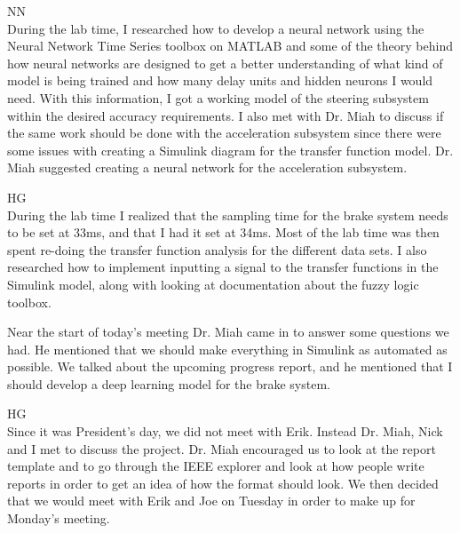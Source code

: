 \documentclass[fontsize=11pt, %
                             paper=letter, %
                             openany, %
                             captions=tableheading,
                             index=totoc,
                             hyperref]{labbook}
\def\currentYear{2021}
\begin{document}
\begin{addmargin}[0cm]{0cm}
\labday{Monday, February 21, \currentYear}
NN\\
During the lab time, I researched how to develop a neural network using the Neural Network Time Series toolbox on MATLAB and some of the theory behind how neural networks are designed to get a better understanding of what kind of model is being trained and how many delay units and hidden neurons I would need. With this information, I got a working model of the steering subsystem within the desired accuracy requirements. I also met with Dr. Miah to discuss if the same work should be done with the acceleration subsystem since there were some issues with creating a Simulink diagram for the transfer function model. Dr. Miah suggested creating a neural network for the acceleration subsystem.

HG\\
During the lab time I realized that the sampling time for the brake system needs to be set at 33ms, and that I had it set at 34ms. Most of the lab time was then spent re-doing the transfer function analysis for the different data sets. I also researched how to implement inputting a signal to the transfer functions in the Simulink model, along with looking at documentation about the fuzzy logic toolbox. 

Near the start of today's meeting Dr. Miah came in to answer some questions we had. He mentioned that we should make everything in Simulink as automated as possible. We talked about the upcoming progress report, and he mentioned that I should develop a deep learning model for the brake system.  


HG\\
Since it was President's day, we did not meet with Erik. Instead Dr. Miah, Nick and I met to discuss the project. Dr. Miah encouraged us to look at the report template and to go through the IEEE explorer and look at how people write reports in order to get an idea of how the format should look. We then decided that we would meet with Erik and Joe on Tuesday in order to make up for Monday's meeting. 


\end{addmargin}
\end{document}
